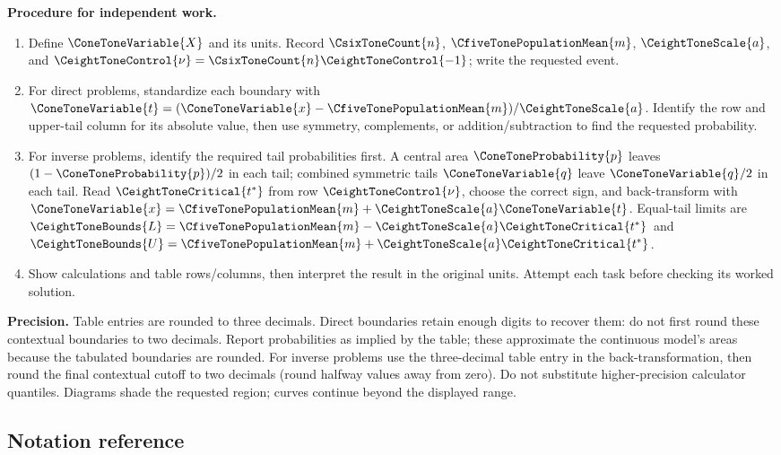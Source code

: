 \textbf{Procedure for independent work.}
\begin{enumerate}
\item Define $\ConeToneVariable{X}$ and its units. Record $\CsixToneCount{n}$, $\CfiveTonePopulationMean{m}$, $\CeightToneScale{a}$, and $\CeightToneControl{\nu}=\CsixToneCount{n}\CeightToneControl{-1}$; write the requested event.
\item For direct problems, standardize each boundary with $\ConeToneVariable{t}=(\ConeToneVariable{x}-\CfiveTonePopulationMean{m})/\CeightToneScale{a}$.
Identify the row and upper-tail column for its absolute value, then use symmetry,
complements, or addition/subtraction to find the requested probability.
\item For inverse problems, identify the required tail probabilities first.
A central area $\ConeToneProbability{p}$ leaves $(1-\ConeToneProbability{p})/2$ in each tail; combined symmetric tails $\ConeToneVariable{q}$ leave $\ConeToneVariable{q}/2$ in each tail.
Read $\CeightToneCritical{t^*}$ from row $\CeightToneControl{\nu}$, choose the correct sign, and back-transform with $\ConeToneVariable{x}=\CfiveTonePopulationMean{m}+\CeightToneScale{a}\ConeToneVariable{t}$.
Equal-tail limits are $\CeightToneBounds{L}=\CfiveTonePopulationMean{m}-\CeightToneScale{a}\CeightToneCritical{t^*}$ and $\CeightToneBounds{U}=\CfiveTonePopulationMean{m}+\CeightToneScale{a}\CeightToneCritical{t^*}$.
\item Show calculations and table rows/columns, then interpret the result in the original units.
Attempt each task before checking its worked solution.
\end{enumerate}

\textbf{Precision.} Table entries are rounded to three decimals. Direct boundaries retain enough
digits to recover them: do not first round these contextual boundaries to two decimals.
Report probabilities as implied by the table; these approximate the continuous model's areas
because the tabulated boundaries are rounded. For inverse problems use the three-decimal table
entry in the back-transformation, then round the final contextual cutoff to two decimals
(round halfway values away from zero). Do not substitute higher-precision calculator quantiles.
Diagrams shade the requested region; curves continue beyond the displayed range.

\subsection*{Notation reference}
\label{tone:C8:reference}
